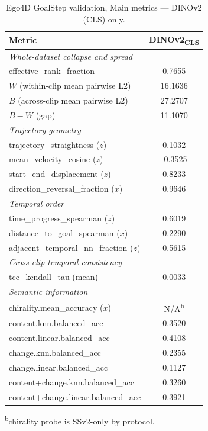 \begin{table}[H]
\centering
\caption{Ego4D GoalStep validation, Main metrics --- DINOv2 (CLS) only.}
\label{tab:encoder-comparison-ego4d-main}
\begin{tabular}{lc}
\toprule
Metric & DINOv2\textsubscript{CLS} \\
\midrule
\multicolumn{2}{l}{\textit{Whole-dataset collapse and spread}} \\
effective\_rank\_fraction & 0.7655 \\
$W$ (within-clip mean pairwise L2) & 16.1636 \\
$B$ (across-clip mean pairwise L2) & 27.2707 \\
$B-W$ (gap) & 11.1070 \\
\midrule
\multicolumn{2}{l}{\textit{Trajectory geometry}} \\
trajectory\_straightness ($z$) & 0.1032 \\
mean\_velocity\_cosine ($z$) & -0.3525 \\
start\_end\_displacement ($z$) & 0.8233 \\
direction\_reversal\_fraction ($x$) & 0.9646 \\
\midrule
\multicolumn{2}{l}{\textit{Temporal order}} \\
time\_progress\_spearman ($z$) & 0.6019 \\
distance\_to\_goal\_spearman ($x$) & 0.2290 \\
adjacent\_temporal\_nn\_fraction ($z$) & 0.5615 \\
\midrule
\multicolumn{2}{l}{\textit{Cross-clip temporal consistency}} \\
tcc\_kendall\_tau (mean) & 0.0033 \\
\midrule
\multicolumn{2}{l}{\textit{Semantic information}} \\
chirality.mean\_accuracy ($x$) & N/A\textsuperscript{b} \\
content.knn.balanced\_acc & 0.3520 \\
content.linear.balanced\_acc & 0.4108 \\
change.knn.balanced\_acc & 0.2355 \\
change.linear.balanced\_acc & 0.1127 \\
content+change.knn.balanced\_acc & 0.3260 \\
content+change.linear.balanced\_acc & 0.3921 \\
\bottomrule
\end{tabular}

\vspace{0.3em}
{\footnotesize \textsuperscript{b}chirality probe is SSv2-only by protocol.}
\end{table}


